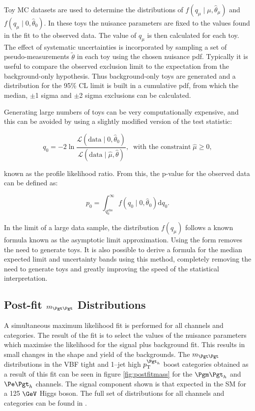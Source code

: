 Toy \ac{MC} datasets are used to determine the distributions of 
$f(q_{\mu}\mid\mu,\hat{\theta}_{\mu})$ and $f(q_{\mu}\mid0,\hat{\theta}_{0})$.
In these toys the nuisance parameters are
fixed to the values found in the fit to the observed data. The value of
$q_{\mu}$ is then calculated for each toy. The effect of systematic
uncertainties is incorporated by sampling a set of pseudo-measurements
$\tilde{\theta}$ in each toy using the chosen nuisance \ac{pdf}.
Typically it is useful to compare the observed exclusion limit to the expectation 
from the background-only hypothesis. Thus background-only toys are generated and
a distribution for the 95\% CL limit is built in a cumulative \ac{pdf}, from
which the median, $\pm$1 sigma and $\pm$2 sigma exclusions can be calculated.

Generating large numbers of toys can be very computationally expensive, and this
can be avoided by using a slightly modified version of the test statistic:

\begin{equation}
q_{0} = -2
\ln\frac{\mathcal{L}(\mathrm{data}\mid0,\hat{\theta}_{0})}{\mathcal{L}(\mathrm{data}\mid\hat{\mu},\hat{\theta})},
\;\; \text{with the constraint} \; \hat{\mu}\geq 0,
\end{equation}

known as the profile likelihood ratio. From this, the p-value for the observed
data can be defined as:

\begin{equation}
p_{0} =
\int_{q_{0}^{\mathrm{obs}}}^{\infty}f(q_{0}\mid0,\hat{\theta}_{0})\mathrm{d}q_{0}
.
\end{equation}

In the limit of a large data sample, the distribution $f(q_{\mu})$ follows a known formula
\cite{Cowan:2011aa} known as the asymptotic limit approximation. Using the form
removes the need to generate toys. It is also possible to derive a formula for
the median expected limit and uncertainty bands using this method, completely
removing the need to generate toys and greatly improving the speed of the
statistical interpretation.

\subsection{Post-fit $m_{\Pgt\Pgt}$ Distributions}

A simultaneous maximum likelihood fit is performed for all channels and
categories. The result of the fit is to select the values of the nuisance
parameters which maximise the likelihood for the signal plus background fit.
This results in small changes in the shape and yield of the backgrounds. The
$m_{\Pgt\Pgt}$ distributions in the VBF tight and 1--jet high $\pt^{\Pgt_{h}}$
boost categories obtained as a result of this fit can be seen in
figure \ref{fig:postfitmass} for the $\mutau$ and $\etau$ channels. The signal
component shown is that expected in the \ac{SM} for a 125 $\GeV$ Higgs boson. The full set
of distributions for all channels and categories can be found in
\cite{HIG-13-004}.

